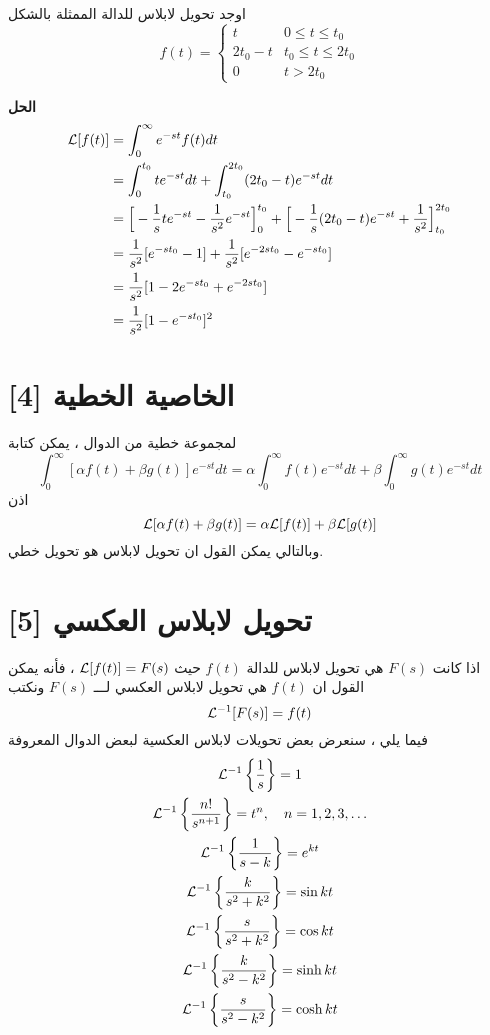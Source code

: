 \begin{example}
	اوجد تحويل لابلاس للدالة الممثلة بالشكل
	\[
	f(t) = 
	\begin{cases}
		t & 0 \leq t \leq t_0 \\
		2t_0 - t & t_0 \leq t \leq 2t_0\\
		0 & t > 2t_0
	\end{cases} 
	\]
\end{example}
\noindent
\textbf{الحل}
\begin{align*}
	\mathcal{L}[f(t)] &= \int_{0}^{\infty} e^{-st} f(t)dt\\
	&= \int_{0}^{t_0} te^{-st}dt + \int_{t_0}^{2t_0} (2t_0 - t)e^{-st}dt\\
	&= \Big[-\frac{1}{s} te^{-st} - \frac{1}{s^2} e^{-st}\Big]^{t_0}_0  + \Big[- \frac{1}{s}(2t_0 - t)e^{-st} + \frac{1}{s^2} \Big]^{2t_0}_{t_0}\\
	&= \frac{1}{s^2}[e^{-st_0} -1] + \frac{1}{s^2} [e^{-2st_0} - e^{-st_0}]\\
	&= \frac{1}{s^2} [ 1-2e^{-st_0} + e^{-2st_0}]\\
	&= \frac{1}{s^2} [1-e^{-st_0}]^2 
\end{align*}

\newpage
\section[الخاصية الخطية]{الخاصية الخطية [4]}
لمجموعة خطية من الدوال ، يمكن كتابة 
\begin{equation}
\int_{0}^{\infty} [\alpha f(t) + \beta g(t)] e^{-st} dt = \alpha \int_{0}^{\infty}  f(t)e^{-st} dt + \beta \int_{0}^{\infty} g(t) e^{-st} dt
 \end{equation}
 اذن
 \begin{equation}
 	\mathcal{L}[\alpha f(t) + \beta g(t)] = \alpha \mathcal{L}[f(t)] + \beta \mathcal{L}[g(t)]
 \end{equation}
 وبالتالي يمكن القول ان تحويل لابلاس هو تحويل خطي.
 
 \section[تحويل لابلاس العكسي]{تحويل لابلاس العكسي [5]} 
 اذا كانت $F(s)$ هي تحويل لابلاس للدالة $f(t)$ حيث $\mathcal{L}[f(t)] = F(s)$ ، فأنه يمكن القول ان $f(t)$ هي تحويل لابلاس العكسي لـــ $F(s)$ ونكتب 
\begin{equation}
	 \mathcal{L}^{-1} [F(s)] = f(t)
\end{equation}
 فيما يلي ، سنعرض بعض تحويلات لابلاس العكسية لبعض الدوال المعروفة
 \begin{gather}
 	\mathcal{L}^{-1} \left\{\frac{1}{s}\right\} = 1\\
 	\mathcal{L}^{-1}\left\{ \frac{n!}{s^{n+1}}\right\} = t^n , \quad n=1,2,3,\dots\\
 	\mathcal{L}^{-1}\left\{\frac{1}{s-k}\right\} = e^{kt}\\
 	\mathcal{L}^{-1}\left\{\frac{k}{s^2 + k^2}\right\} = \sin kt\\
 	\mathcal{L}^{-1}\left\{\frac{s}{s^2 + k^2}\right\} = \cos kt\\
 	\mathcal{L}^{-1}\left\{\frac{k}{s^2 - k^2}\right\} = \sinh kt\\
 	\mathcal{L}^{-1}\left\{\frac{s}{s^2 - k^2}\right\} = \cosh kt
 \end{gather}
 
